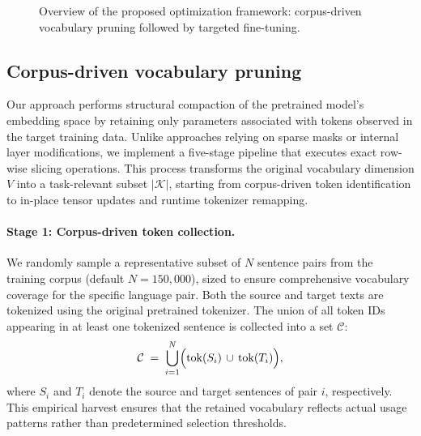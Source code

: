 \documentclass{article}
\begin{document}
	\begin{figure}[h]
		\centering
		\caption{Overview of the proposed optimization framework: corpus-driven vocabulary pruning followed by targeted fine-tuning.}
		\label{fig:overview}
	\end{figure}
	
	\subsection{Corpus-driven vocabulary pruning}
	\label{sec:pruning}
	Our approach performs structural compaction of the pretrained model's embedding space by
	retaining only parameters associated with tokens observed in the target training data. Unlike
	approaches relying on sparse masks or internal layer modifications, we implement a five-stage
	pipeline that executes exact row-wise slicing operations. This process transforms the original
	vocabulary dimension $V$ into a task-relevant subset $|\mathcal{K}|$, starting from corpus-driven token
	identification to in-place tensor updates and runtime tokenizer remapping.
	
	\paragraph{Stage 1: Corpus-driven token collection.}
	
	We randomly sample a representative subset of $N$ sentence pairs from the training corpus
	(default $N=150{,}000$), sized to ensure comprehensive vocabulary coverage for the specific
	language pair. Both the source and target texts are tokenized using the original pretrained
	tokenizer. The union of all token IDs appearing in at least one tokenized sentence is collected
	into a set $\mathcal{C}$:
	\[
	\mathcal{C} \;=\; \bigcup_{i=1}^{N} \Bigl( \mathrm{tok}(S_i) \,\cup\, \mathrm{tok}(T_i) \Bigr),
	\]
	where $S_i$ and $T_i$ denote the source and target sentences of pair $i$, respectively. This
	empirical harvest ensures that the retained vocabulary reflects actual usage patterns rather
	than predetermined selection thresholds.
	
\end{document}
